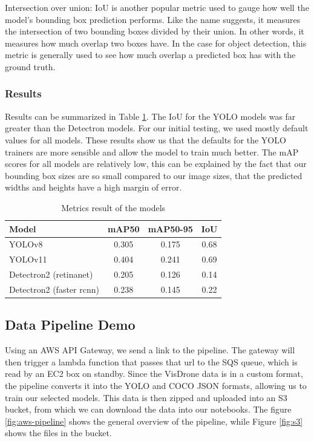 \documentclass[stu,12pt,floatsintext]{apa7}
\begin{document}
Intersection over union: IoU is another popular metric used to gauge how well the model's bounding box prediction performs. Like the name suggests, it measures the intersection of two bounding boxes divided by their union. In other words, it measures how much overlap two boxes have. In the case for object detection, this metric is generally used to see how much overlap a predicted box has with the ground truth.

\subsubsection{Results}
Results can be summarized in Table \ref{tab:results}. The IoU for the YOLO models was far greater than the Detectron models. For our initial testing, we used mostly default values for all models. These results show us that the defaults for the YOLO trainers are more sensible and allow the model to train much better. The mAP scores for all models are relatively low, this can be explained by the fact that our bounding box sizes are so small compared to our image sizes, that the predicted widths and heights have a high margin of error.

\begin{table}[!htb]
    \centering
    \begin{tabular}{lccc}
    \hline
         Model&  mAP50&  mAP50-95& IoU\\
    \hline
         YOLOv8&   0.305&  0.175& 0.68\\
         YOLOv11&  0.404&   0.241& 0.69\\
         Detectron2 (retinanet)&  0.205&  0.126&  0.14\\
         Detectron2 (faster rcnn)&   0.238&  0.145&  0.22\\
    \hline
    \end{tabular}
    \caption{Metrics result of the models}
    \label{tab:results}
\end{table}

\subsection{Data Pipeline Demo}

Using an AWS API Gateway, we send a link to the  pipeline. The gateway will then trigger a lambda function that passes that url to the SQS queue, which is read by an EC2 box on standby. Since the VisDrone data is in a custom format, the pipeline converts it into the YOLO and COCO JSON formats, allowing us to train our selected models. This data is then zipped and uploaded into an S3 bucket, from which we can download the data into our notebooks. The figure \ref{fig:aws-pipeline} shows the general overview of the pipeline, while Figure \ref{fig:s3} shows the files in the bucket.
\end{document}
